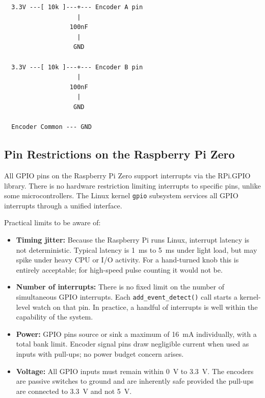 \begin{verbatim}
  3.3V ---[ 10k ]---+--- Encoder A pin
                    |
                  100nF
                    |
                   GND
                   
  3.3V ---[ 10k ]---+--- Encoder B pin
                    |
                  100nF
                    |
                   GND

  Encoder Common --- GND
\end{verbatim}

\subsection{Pin Restrictions on the Raspberry Pi Zero}

All GPIO pins on the Raspberry Pi Zero support interrupts via the RPi.GPIO library.
There is no hardware restriction limiting interrupts to specific pins, unlike some
microcontrollers. The Linux kernel \texttt{gpio} subsystem services all GPIO interrupts
through a unified interface.

Practical limits to be aware of:

\begin{itemize}
    \item \textbf{Timing jitter:} Because the Raspberry Pi runs Linux, interrupt
    latency is not deterministic. Typical latency is \SI{1}{\milli\second} to
    \SI{5}{\milli\second} under light load, but may spike under heavy CPU or I/O
    activity. For a hand-turned knob this is entirely acceptable; for high-speed
    pulse counting it would not be.

    \item \textbf{Number of interrupts:} There is no fixed limit on the number of
    simultaneous GPIO interrupts. Each \texttt{add\_event\_detect()} call starts a
    kernel-level watch on that pin. In practice, a handful of interrupts is well
    within the capability of the system.

    \item \textbf{Power:} GPIO pins source or sink a maximum of \SI{16}{\milli\ampere}
    individually, with a total bank limit. Encoder signal pins draw negligible current
    when used as inputs with pull-ups; no power budget concern arises.

    \item \textbf{Voltage:} All GPIO inputs must remain within \SI{0}{\volt} to
    \SI{3.3}{\volt}. The encoders are passive switches to ground and are inherently
    safe provided the pull-ups are connected to \SI{3.3}{\volt} and not \SI{5}{\volt}.
\end{itemize}

